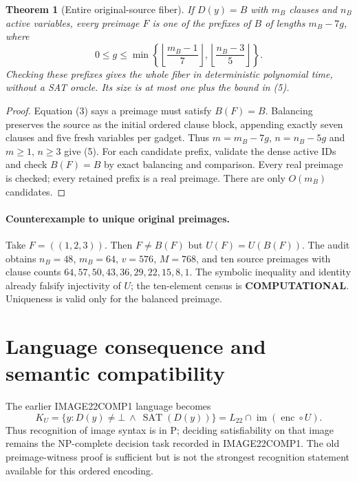\documentclass[11pt]{article}
\newtheorem{theorem}{Theorem}
\newcommand{\SAT}{\operatorname{SAT}}
\newcommand{\Img}{\operatorname{im}}
\newcommand{\enc}{\operatorname{enc}}
\begin{document}
\begin{theorem}[Entire original-source fiber]\label{thm:fiber}
If $D(y)=B$ with $m_B$ clauses and $n_B$ active variables, every preimage $F$
is one of the prefixes of $B$ of lengths $m_B-7g$, where
\[
 0\le g\le \min\left\{\left\lfloor\frac{m_B-1}{7}\right\rfloor,
                         \left\lfloor\frac{n_B-3}{5}\right\rfloor\right\}.
                                                                    \tag{5}
\]
Checking these prefixes gives the whole fiber in deterministic polynomial
time, without a SAT oracle. Its size is at most one plus the bound in (5).
\end{theorem}
\begin{proof}
Equation (3) says a preimage must satisfy $B(F)=B$. Balancing preserves the
source as the initial ordered clause block, appending exactly seven clauses
and five fresh variables per gadget. Thus $m=m_B-7g$, $n=n_B-5g$ and $m\ge1$,
$n\ge3$ give (5). For each candidate prefix, validate the dense active IDs
and check $B(F)=B$ by exact balancing and comparison. Every real preimage is
checked; every retained prefix is a real preimage. There are only $O(m_B)$
candidates.
\end{proof}

\paragraph{Counterexample to unique original preimages.}
Take $F=((1,2,3))$. Then $F\ne B(F)$ but $U(F)=U(B(F))$. The audit obtains
$n_B=48$, $m_B=64$, $v=576$, $M=768$, and ten source preimages with clause
counts $64,57,50,43,36,29,22,15,8,1$. The symbolic inequality and identity
already falsify injectivity of $U$; the ten-element census is
\textbf{COMPUTATIONAL}. Uniqueness is valid only for the balanced preimage.

\section{Language consequence and semantic compatibility}
The earlier IMAGE22COMP1 language becomes
\[
 K_U=\{y:D(y)\ne\bot\ \land\ \SAT(D(y))\}
     =L_{22}\cap\Img(\enc\circ U).                        \tag{6}
\]
Thus recognition of image syntax is in P; deciding satisfiability on that
image remains the NP-complete decision task recorded in IMAGE22COMP1.
The old preimage-witness proof is sufficient but is not the strongest
recognition statement available for this ordered encoding.
\end{document}
